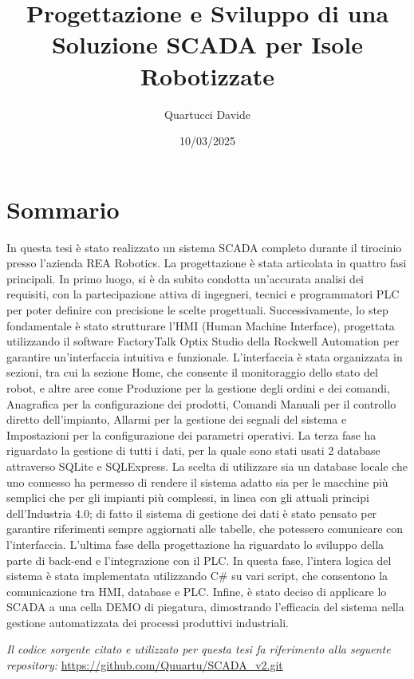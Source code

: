 \documentclass[12pt,a4paper,twoside,openright]{extreport}
\title{Progettazione e Sviluppo di una Soluzione SCADA per Isole Robotizzate}
\author{Quartucci Davide}
\date{10/03/2025}
\begin{document}
    \pagestyle{empty}                           %

    
    \cleardoublepage
    
    
    \cleardoublepage

    \pagestyle{plain}                           %

    \chapter*{Sommario}
    In questa tesi è stato realizzato un sistema SCADA completo durante il tirocinio presso l'azienda REA Robotics. La progettazione è stata articolata in quattro fasi principali. In primo luogo, si è da subito condotta un'accurata analisi dei requisiti, con la partecipazione attiva di ingegneri, tecnici e programmatori PLC per poter definire con precisione le scelte progettuali. Successivamente, lo step fondamentale è stato strutturare l'HMI (Human Machine Interface), progettata utilizzando il software FactoryTalk Optix Studio della Rockwell Automation per garantire un'interfaccia intuitiva e funzionale. L'interfaccia è stata organizzata in sezioni, tra cui la sezione Home, che consente il monitoraggio dello stato del robot, e altre aree come Produzione per la gestione degli ordini e dei comandi, Anagrafica per la configurazione dei prodotti, Comandi Manuali per il controllo diretto dell'impianto, Allarmi per la gestione dei segnali del sistema e Impostazioni per la configurazione dei parametri operativi. La terza fase ha riguardato la gestione di tutti i dati, per la quale sono stati usati 2 database attraverso SQLite e SQLExpress. La scelta di utilizzare sia un database locale che uno connesso ha permesso di rendere il sistema adatto sia per le macchine più semplici che per gli impianti più complessi, in linea con gli attuali principi dell'Industria 4.0; di fatto il sistema di gestione dei dati è stato pensato per garantire riferimenti sempre aggiornati alle tabelle, che potessero comunicare con l'interfaccia. L'ultima fase della progettazione ha riguardato lo sviluppo della parte di back-end e l'integrazione con il PLC. In questa fase, l'intera logica del sistema è stata implementata utilizzando C\# su vari script, che consentono la comunicazione tra HMI, database e PLC. Infine, è stato deciso di applicare lo SCADA a una cella DEMO di piegatura, dimostrando l'efficacia del sistema nella gestione automatizzata dei processi produttivi industriali. 
    \begin{flushright}
        \textit{Il codice sorgente citato e utilizzato per questa tesi fa riferimento alla seguente repository:} \url{https://github.com/Quuartu/SCADA_v2.git}    
    \end{flushright}
    
\end{document}
